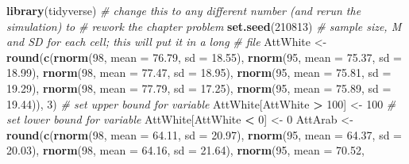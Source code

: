 \documentclass[
  11pt,
]{book}
\newenvironment{Shaded}{\begin{snugshade}}{\end{snugshade}}
\newcommand{\AttributeTok}[1]{\textcolor[rgb]{0.27,0.27,0.27}{#1}}
\newcommand{\CommentTok}[1]{\textcolor[rgb]{0.37,0.37,0.37}{\textit{#1}}}
\newcommand{\DecValTok}[1]{\textcolor[rgb]{0.06,0.06,0.06}{#1}}
\newcommand{\FloatTok}[1]{\textcolor[rgb]{0.06,0.06,0.06}{#1}}
\newcommand{\FunctionTok}[1]{\textcolor[rgb]{0.27,0.27,0.27}{\textbf{#1}}}
\newcommand{\NormalTok}[1]{#1}
\newcommand{\OtherTok}[1]{\textcolor[rgb]{0.37,0.37,0.37}{#1}}
\newcommand{\SpecialCharTok}[1]{\textcolor[rgb]{0.43,0.43,0.43}{\textbf{#1}}}
\begin{document}
\begin{Shaded}
\begin{Highlighting}[]
\FunctionTok{library}\NormalTok{(tidyverse)}
\CommentTok{\# change this to any different number (and rerun the simulation) to}
\CommentTok{\# rework the chapter problem}
\FunctionTok{set.seed}\NormalTok{(}\DecValTok{210813}\NormalTok{)}
\CommentTok{\# sample size, M and SD for each cell; this will put it in a long}
\CommentTok{\# file}
\NormalTok{AttWhite }\OtherTok{\textless{}{-}} \FunctionTok{round}\NormalTok{(}\FunctionTok{c}\NormalTok{(}\FunctionTok{rnorm}\NormalTok{(}\DecValTok{98}\NormalTok{, }\AttributeTok{mean =} \FloatTok{76.79}\NormalTok{, }\AttributeTok{sd =} \FloatTok{18.55}\NormalTok{), }\FunctionTok{rnorm}\NormalTok{(}\DecValTok{95}\NormalTok{, }\AttributeTok{mean =} \FloatTok{75.37}\NormalTok{,}
    \AttributeTok{sd =} \FloatTok{18.99}\NormalTok{), }\FunctionTok{rnorm}\NormalTok{(}\DecValTok{98}\NormalTok{, }\AttributeTok{mean =} \FloatTok{77.47}\NormalTok{, }\AttributeTok{sd =} \FloatTok{18.95}\NormalTok{), }\FunctionTok{rnorm}\NormalTok{(}\DecValTok{95}\NormalTok{, }\AttributeTok{mean =} \FloatTok{75.81}\NormalTok{,}
    \AttributeTok{sd =} \FloatTok{19.29}\NormalTok{), }\FunctionTok{rnorm}\NormalTok{(}\DecValTok{98}\NormalTok{, }\AttributeTok{mean =} \FloatTok{77.79}\NormalTok{, }\AttributeTok{sd =} \FloatTok{17.25}\NormalTok{), }\FunctionTok{rnorm}\NormalTok{(}\DecValTok{95}\NormalTok{, }\AttributeTok{mean =} \FloatTok{75.89}\NormalTok{,}
    \AttributeTok{sd =} \FloatTok{19.44}\NormalTok{)), }\DecValTok{3}\NormalTok{)}
\CommentTok{\# set upper bound for variable}
\NormalTok{AttWhite[AttWhite }\SpecialCharTok{\textgreater{}} \DecValTok{100}\NormalTok{] }\OtherTok{\textless{}{-}} \DecValTok{100}
\CommentTok{\# set lower bound for variable}
\NormalTok{AttWhite[AttWhite }\SpecialCharTok{\textless{}} \DecValTok{0}\NormalTok{] }\OtherTok{\textless{}{-}} \DecValTok{0}
\NormalTok{AttArab }\OtherTok{\textless{}{-}} \FunctionTok{round}\NormalTok{(}\FunctionTok{c}\NormalTok{(}\FunctionTok{rnorm}\NormalTok{(}\DecValTok{98}\NormalTok{, }\AttributeTok{mean =} \FloatTok{64.11}\NormalTok{, }\AttributeTok{sd =} \FloatTok{20.97}\NormalTok{), }\FunctionTok{rnorm}\NormalTok{(}\DecValTok{95}\NormalTok{, }\AttributeTok{mean =} \FloatTok{64.37}\NormalTok{,}
    \AttributeTok{sd =} \FloatTok{20.03}\NormalTok{), }\FunctionTok{rnorm}\NormalTok{(}\DecValTok{98}\NormalTok{, }\AttributeTok{mean =} \FloatTok{64.16}\NormalTok{, }\AttributeTok{sd =} \FloatTok{21.64}\NormalTok{), }\FunctionTok{rnorm}\NormalTok{(}\DecValTok{95}\NormalTok{, }\AttributeTok{mean =} \FloatTok{70.52}\NormalTok{,}

\end{Highlighting}
\end{Shaded}
\end{document}

